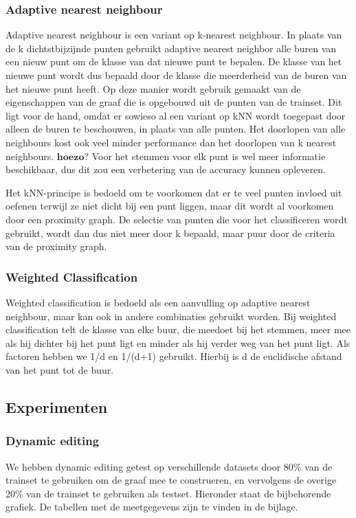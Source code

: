 \documentclass{article}
\begin{document}
\subsubsection{Adaptive nearest neighbour}
Adaptive nearest neighbour is een variant op k-nearest neighbour. In plaats van de k dichtstbijzijnde punten gebruikt adaptive nearest neighbor alle buren van een nieuw punt om de klasse van dat nieuwe punt te bepalen. De klasse van het nieuwe punt wordt dus bepaald door de klasse die meerderheid van de buren van het nieuwe punt heeft. Op deze manier wordt gebruik gemaakt van de eigenschappen van de graaf die is opgebouwd uit de punten van de trainset. Dit ligt voor de hand, omdat er sowieso al een variant op kNN wordt toegepast door alleen de buren te beschouwen, in plaats van alle punten. Het doorlopen van alle neighbours kost ook veel minder performance dan het doorlopen van k nearest neighbours. \underline{$\mathbf{hoezo?}$}
Voor het stemmen voor elk punt is wel meer informatie beschikbaar, dus dit zou een verbetering van de accuracy kunnen opleveren.

Het kNN-principe is bedoeld om te voorkomen dat er te veel punten invloed uit oefenen terwijl ze niet dicht bij een punt liggen, maar dit wordt al voorkomen door een proximity graph. De selectie van punten die voor het classificeren wordt gebruikt, wordt dan dus niet meer door k bepaald, maar puur door de criteria van de proximity graph.

\subsubsection{Weighted Classification}
Weighted classification is bedoeld als een aanvulling op adaptive nearest neighbour, maar kan ook in andere combinaties gebruikt worden. Bij weighted classification telt de klasse van elke buur, die meedoet bij het stemmen, meer mee als hij dichter bij het punt ligt en minder als hij verder weg van het punt ligt. Als factoren hebben we 1/d en 1/(d+1) gebruikt. Hierbij is d de euclidische afstand van het punt tot de buur.

\subsection{Experimenten}
\subsubsection{Dynamic editing}
We hebben dynamic editing getest op verschillende datasets door 80\% van de trainset te gebruiken om de graaf mee te construeren, en vervolgens de overige 20\% van de trainset te gebruiken als testset. Hieronder staat de bijbehorende grafiek. De tabellen met de meetgegevens zijn te vinden in de bijlage.
\end{document}
